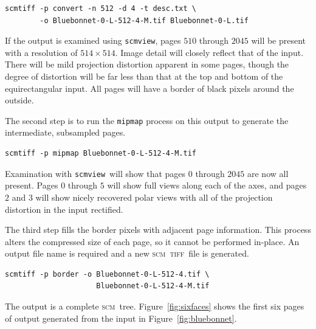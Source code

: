 \documentclass[oneside,10pt]{memoir}
\newcommand{\scm}     {\textsc{scm}}
\newcommand{\tiff}    {\textsc{tiff}}
\newcommand{\scmview} {\texttt{scmview}}
\begin{document}
\begin{Spacing}{1.1}
\begin{Verbatim}
scmtiff -p convert -n 512 -d 4 -t desc.txt \
        -o Bluebonnet-0-L-512-4-M.tif Bluebonnet-0-L.tif
\end{Verbatim}

If the output is examined using \scmview, pages $510$ through $2045$ will be present with a resolution of $514\times 514$. Image detail will closely reflect that of the input. There will be mild projection distortion apparent in some pages, though the degree of distortion will be far less than that at the top and bottom of the equirectangular input. All pages will have a border of black pixels around the outside.

The second step is to run the \texttt{mipmap} process on this output to generate the intermediate, subsampled pages.

\begin{Verbatim}
scmtiff -p mipmap Bluebonnet-0-L-512-4-M.tif
\end{Verbatim}

Examination with \scmview\ will show that pages $0$ through $2045$ are now all present. Pages $0$ through $5$ will show full views along each of the axes, and pages $2$ and $3$ will show nicely recovered polar views with all of the projection distortion in the input rectified.

The third step fills the border pixels with adjacent page information. This process alters the compressed size of each page, so it cannot be performed in-place. An output file name is required and a new \scm\ \tiff\ file is generated.

\begin{Verbatim}
scmtiff -p border -o Bluebonnet-0-L-512-4.tif \
                     Bluebonnet-0-L-512-4-M.tif
\end{Verbatim}

The output is a complete \scm\ tree. Figure~\ref{fig:sixfaces} shows the first six pages of output generated from the input in Figure~\ref{fig:bluebonnet}.


\end{Spacing}
\end{document}
